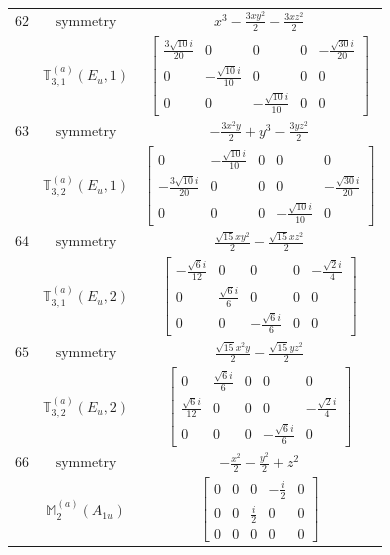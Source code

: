 \documentclass[fleqn,8pt,landscape]{jsarticle}
\begin{document}
\begin{longtable}{ccc}
$ 62 $ & $ \text{symmetry} $ & $ x^{3} - \frac{3 x y^{2}}{2} - \frac{3 x z^{2}}{2} $ \\
$  $ & $ \mathbb{T}_{3,1}^{(a)}(E_{u},1) $ & $ \begin{bmatrix} \frac{3 \sqrt{10} i}{20} & 0 & 0 & 0 & - \frac{\sqrt{30} i}{20} \\ 0 & - \frac{\sqrt{10} i}{10} & 0 & 0 & 0 \\ 0 & 0 & - \frac{\sqrt{10} i}{10} & 0 & 0 \end{bmatrix} $ \\ \hline
$ 63 $ & $ \text{symmetry} $ & $ - \frac{3 x^{2} y}{2} + y^{3} - \frac{3 y z^{2}}{2} $ \\
$  $ & $ \mathbb{T}_{3,2}^{(a)}(E_{u},1) $ & $ \begin{bmatrix} 0 & - \frac{\sqrt{10} i}{10} & 0 & 0 & 0 \\ - \frac{3 \sqrt{10} i}{20} & 0 & 0 & 0 & - \frac{\sqrt{30} i}{20} \\ 0 & 0 & 0 & - \frac{\sqrt{10} i}{10} & 0 \end{bmatrix} $ \\ \hline
$ 64 $ & $ \text{symmetry} $ & $ \frac{\sqrt{15} x y^{2}}{2} - \frac{\sqrt{15} x z^{2}}{2} $ \\
$  $ & $ \mathbb{T}_{3,1}^{(a)}(E_{u},2) $ & $ \begin{bmatrix} - \frac{\sqrt{6} i}{12} & 0 & 0 & 0 & - \frac{\sqrt{2} i}{4} \\ 0 & \frac{\sqrt{6} i}{6} & 0 & 0 & 0 \\ 0 & 0 & - \frac{\sqrt{6} i}{6} & 0 & 0 \end{bmatrix} $ \\ \hline
$ 65 $ & $ \text{symmetry} $ & $ \frac{\sqrt{15} x^{2} y}{2} - \frac{\sqrt{15} y z^{2}}{2} $ \\
$  $ & $ \mathbb{T}_{3,2}^{(a)}(E_{u},2) $ & $ \begin{bmatrix} 0 & \frac{\sqrt{6} i}{6} & 0 & 0 & 0 \\ \frac{\sqrt{6} i}{12} & 0 & 0 & 0 & - \frac{\sqrt{2} i}{4} \\ 0 & 0 & 0 & - \frac{\sqrt{6} i}{6} & 0 \end{bmatrix} $ \\ \hline
$ 66 $ & $ \text{symmetry} $ & $ - \frac{x^{2}}{2} - \frac{y^{2}}{2} + z^{2} $ \\
$  $ & $ \mathbb{M}_{2}^{(a)}(A_{1u}) $ & $ \begin{bmatrix} 0 & 0 & 0 & - \frac{i}{2} & 0 \\ 0 & 0 & \frac{i}{2} & 0 & 0 \\ 0 & 0 & 0 & 0 & 0 \end{bmatrix} $ \\ \hline

\end{longtable}
\end{document}
